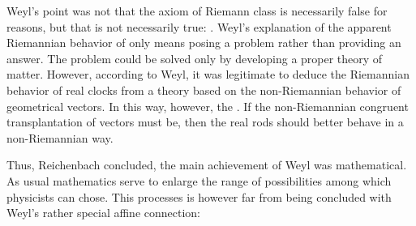 \documentclass[draft]{article}
\begin{document}

Weyl's point was not that the axiom of Riemann class is necessarily false for \apr reasons, but that is not necessarily true: . Weyl's explanation of the apparent Riemannian behavior of   \citep[368]{Reichenbach1922a} only means posing a problem rather than providing an answer. The problem could be solved only by developing a proper theory of matter. However, according to Weyl, it was legitimate to deduce the Riemannian behavior of real clocks from a theory based on the non-Riemannian behavior of geometrical vectors. In this way, however, the   \citep[368]{Reichenbach1922a}. If the non-Riemannian congruent transplantation of vectors must be, then the real rods should better behave in a non-Riemannian way. 

Thus, Reichenbach concluded, the main achievement of Weyl was mathematical. As usual mathematics serve to enlarge the range of possibilities among which physicists can chose. This processes is however far from being concluded with Weyl's rather special affine connection:
\end{document}
